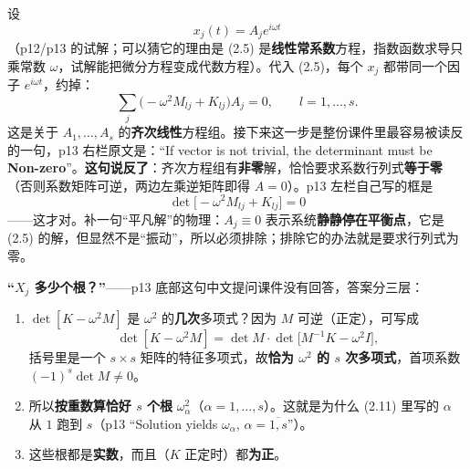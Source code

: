\documentclass[11pt]{ctexart}
\begin{document}
设
\[
x_j(t)=A_je^{i\omega t}
\tag{2.11}
\]
（p12/p13 的试解；可以猜它的理由是 (2.5) 是\textbf{线性常系数}方程，指数函数求导只乘常数 $\omega$，试解能把微分方程变成代数方程）。代入 (2.5)，每个 $x_j$ 都带同一个因子 $e^{i\omega t}$，约掉：
\[
\sum_j\bigl(-\omega^2M_{lj}+K_{lj}\bigr)A_j=0,\qquad l=1,\dots,s .
\tag{2.12}
\]
这是关于 $A_1,\dots,A_s$ 的\textbf{齐次线性}方程组。接下来这一步是整份课件里最容易被读反的一句，p13 右栏原文是：“If vector is not trivial, the determinant must be \textbf{Non-zero}”。\textbf{这句说反了}：齐次方程组有\textbf{非零}解，恰恰要求系数行列式\textbf{等于零}（否则系数矩阵可逆，两边左乘逆矩阵即得 $A=0$）。p13 左栏自己写的框是
\[
\det\bigl[-\omega^2M_{lj}+K_{lj}\bigr]=0
\tag{2.13}
\]
——这才对。补一句“平凡解”的物理：$A_j\equiv0$ 表示系统\textbf{静静停在平衡点}，它是 (2.5) 的解，但显然不是“振动”，所以必须排除；排除它的办法就是要求行列式为零。

\textbf{“$X_j$ 多少个根？”}——p13 底部这句中文提问课件没有回答，答案分三层：

\begin{enumerate}
\item $\det[K-\omega^2M]$ 是 $\omega^2$ 的\textbf{几次}多项式？因为 $M$ 可逆（正定），可写成
\[
\det[K-\omega^2M]=\det M\cdot\det\bigl[M^{-1}K-\omega^2 I\bigr],
\tag{2.14}
\]
括号里是一个 $s\times s$ 矩阵的特征多项式，故\textbf{恰为 $\omega^2$ 的 $s$ 次多项式}，首项系数 $(-1)^s\det M\ne0$。
\item 所以\textbf{按重数算恰好 $s$ 个根} $\omega_\alpha^2$（$\alpha=1,\dots,s$）。这就是为什么 (2.11) 里写的 $\alpha$ 从 $1$ 跑到 $s$（p13 “Solution yields $\omega_\alpha$, $\alpha=\overline{1,s}$”）。
\item 这些根都是\textbf{实数}，而且（$K$ 正定时）都\textbf{为正}。

\end{enumerate}

\end{document}
